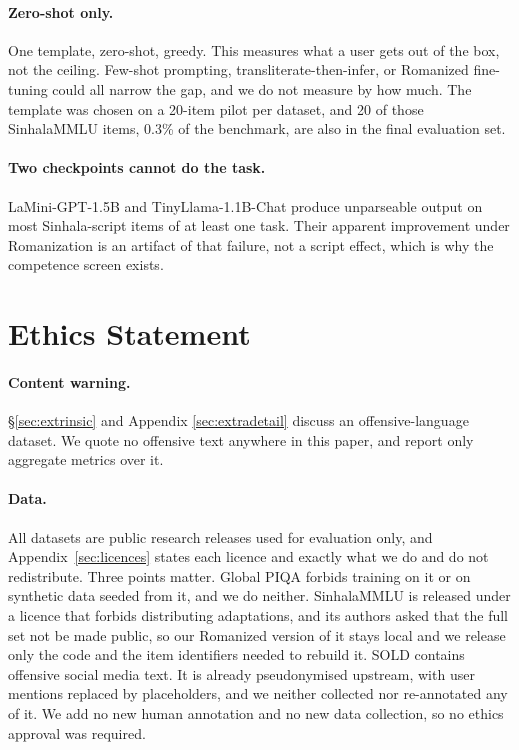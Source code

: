 \documentclass[11pt]{article}
\begin{document}
\paragraph{Zero-shot only.} One template, zero-shot, greedy. This measures what a
user gets out of the box, not the ceiling. Few-shot prompting,
transliterate-then-infer, or Romanized fine-tuning could all narrow the gap, and
we do not measure by how much. The template was chosen on a 20-item pilot per
dataset, and 20 of those SinhalaMMLU items, 0.3\% of the benchmark, are also in
the final evaluation set.

\paragraph{Two checkpoints cannot do the task.} LaMini-GPT-1.5B and
TinyLlama-1.1B-Chat produce unparseable output on most Sinhala-script items of at
least one task. Their apparent improvement under Romanization is an artifact of
that failure, not a script effect, which is why the competence screen exists.

\section*{Ethics Statement}

\paragraph{Content warning.} \S\ref{sec:extrinsic} and Appendix
\ref{sec:extradetail} discuss an offensive-language dataset. We quote no
offensive text anywhere in this paper, and report only aggregate metrics over it.

\paragraph{Data.} All datasets are public research releases used for evaluation
only, and Appendix~\ref{sec:licences} states each licence and exactly what we do
and do not redistribute. Three points matter. Global PIQA forbids training on it
or on synthetic data seeded from it, and we do neither. SinhalaMMLU is released
under a licence that forbids distributing adaptations, and its authors asked that
the full set not be made public, so our Romanized version of it stays local and
we release only the code and the item identifiers needed to rebuild it. SOLD
contains offensive social media text. It is already pseudonymised upstream, with
user mentions replaced by placeholders, and we neither collected nor re-annotated
any of it. We add no new human annotation and no new data collection, so no
ethics approval was required.
\end{document}
